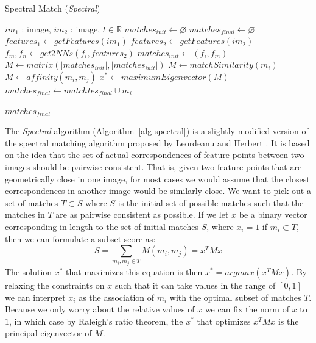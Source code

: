 \begin{algorithm}[h]
\caption{Spectral Match (\emph{Spectral})}
\label{alg-spectral}
\begin{algorithmic}
\Require $im_1$ : image, $im_2$ : image, $t \in \mathbb{R}$
\State $matches_{init}\gets \varnothing$
\State $matches_{final} \gets \varnothing$
\State $features_1 \gets getFeatures(im_1)$
\State $features_2 \gets getFeatures(im_2)$
	\State $f_m,f_n \gets get2NNs(f_i, features_2)$
	\State $matches_{init} \gets \left(f_i, f_m\right)$
\EndFor
\State $M \gets matrix(\left\vert matches_{init} \right\vert, \left\vert 
matches_{init} \right\vert)$
			\State $M \gets matchSimilarity(m_i)$
		\Else
			\State $M \gets affinity(m_i, m_j)$
		\EndIf
	\EndFor
\EndFor
\State $x^{*} \gets maximumEigenvector(M)$
		\State $matches_{final} \gets matchtes_{final} \cup m_i$
	\EndIf
\EndFor

\Return $matches_{final}$
\end{algorithmic}
\end{algorithm}

The \emph{Spectral} algorithm (Algorithm~\ref{alg-spectral}) is a 
slightly modified version of the spectral matching algorithm proposed by
Leordeanu and Herbert \cite{leordeanu2005spectral}. It is based on the 
idea that the set of actual correspondences of feature points between 
two images should be pairwise consistent. That is, given two feature 
points that are geometrically close in one image, for most cases we 
would assume that the closest correspondences in another image would be 
similarly close. We want to pick out a set of matches $T \subset S$ 
where $S$ is the initial set of possible matches such that the matches 
in $T$ are as pairwise consistent as possible. If we let $x$ be a binary 
vector corresponding in length to the set of initial matches $S$, where 
$x_i = 1$ if $m_i \subset T$, then we can formulate a subset-score as:
\begin{equation*}
	S = \sum_{m_i, m_j \in T} M(m_i, m_j) = x^TMx
\end{equation*}
The solution $x^{*}$ that maximizes this equation is then $x^{*} = 
argmax(x^TMx)$. By relaxing the constraints on $x$ such that it can take
values in the range of $\left[0, 1\right]$ we can interpret $x_i$ as the
association of $m_i$ with the optimal subset of matches $T$. Because we 
only worry about the relative values of $x$ we can fix the norm of $x$ 
to $1$, in which case by Raleigh's ratio theorem, the $x^{*}$ that 
optimizes $x^TMx$ is the principal eigenvector of $M$.

